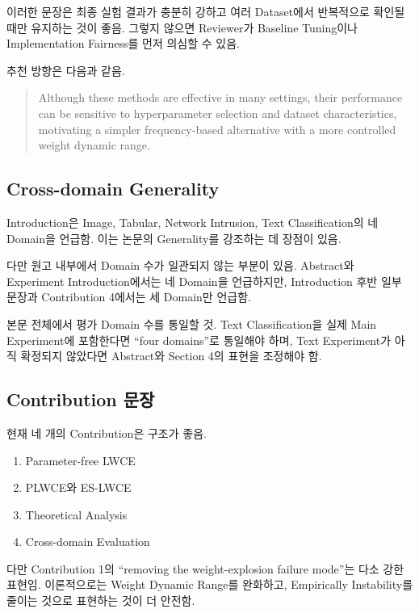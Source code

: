 \documentclass[11pt,a4paper]{article}
\begin{document}
이러한 문장은 최종 실험 결과가 충분히 강하고 여러 Dataset에서 반복적으로 확인될 때만 유지하는 것이 좋음. 그렇지 않으면 Reviewer가 Baseline Tuning이나 Implementation Fairness를 먼저 의심할 수 있음.

추천 방향은 다음과 같음.

\begin{quote}
Although these methods are effective in many settings, their performance can be sensitive to hyperparameter selection and dataset characteristics, motivating a simpler frequency-based alternative with a more controlled weight dynamic range.
\end{quote}

\subsection{Cross-domain Generality}

Introduction은 Image, Tabular, Network Intrusion, Text Classification의 네 Domain을 언급함. 이는 논문의 Generality를 강조하는 데 장점이 있음.

다만 원고 내부에서 Domain 수가 일관되지 않는 부분이 있음. Abstract와 Experiment Introduction에서는 네 Domain을 언급하지만, Introduction 후반 일부 문장과 Contribution 4에서는 세 Domain만 언급함.

\begin{tcolorbox}[title=반드시 수정]
본문 전체에서 평가 Domain 수를 통일할 것. Text Classification을 실제 Main Experiment에 포함한다면 ``four domains''로 통일해야 하며, Text Experiment가 아직 확정되지 않았다면 Abstract와 Section 4의 표현을 조정해야 함.
\end{tcolorbox}

\subsection{Contribution 문장}

현재 네 개의 Contribution은 구조가 좋음.

\begin{enumerate}
\item Parameter-free LWCE
\item PLWCE와 ES-LWCE
\item Theoretical Analysis
\item Cross-domain Evaluation
\end{enumerate}

다만 Contribution 1의 ``removing the weight-explosion failure mode''는 다소 강한 표현임. 이론적으로는 Weight Dynamic Range를 완화하고, Empirically Instability를 줄이는 것으로 표현하는 것이 더 안전함.
\end{document}
